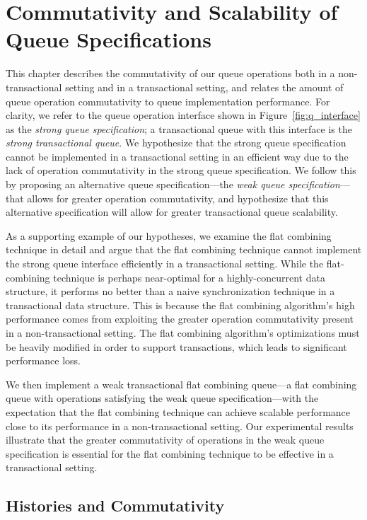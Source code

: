 \chapter{Commutativity and Scalability of Queue Specifications}
\label{commutativity}

This chapter describes the commutativity of our queue operations both in a non-transactional setting and in a transactional setting, and relates the amount of queue operation commutativity to queue implementation performance. For clarity, we refer to the queue operation interface shown in Figure~\ref{fig:q_interface} as the \emph{strong queue specification}; a transactional queue with this interface is the \emph{strong transactional queue}. We hypothesize that the strong queue specification cannot be implemented in a transactional setting in an efficient way due to the lack of operation commutativity in the strong queue specification. 
We follow this by proposing an alternative queue specification---the \emph{weak queue specification}---that allows for greater operation commutativity, and hypothesize that this alternative specification will allow for greater transactional queue scalability.

As a supporting example of our hypotheses, we examine the flat combining technique in detail and argue that the flat combining technique cannot implement the strong queue interface efficiently in a transactional setting. While the flat-combining technique is perhaps near-optimal for a highly-concurrent data structure, it performs no better than a naive synchronization technique in a transactional data structure. This is because the flat combining algorithm's high performance comes from exploiting the greater operation commutativity present in a non-transactional setting. The flat combining algorithm's optimizations must be heavily modified in order to support transactions, which leads to significant performance loss. 

We then implement a weak transactional flat combining queue---a flat combining queue with operations satisfying the weak queue specification---with the expectation that the flat combining technique can achieve scalable performance close to its performance in a non-transactional setting. Our experimental results illustrate that the greater commutativity of operations in the weak queue specification is essential for the flat combining technique to be effective in a transactional setting.

\section{Histories and Commutativity}

